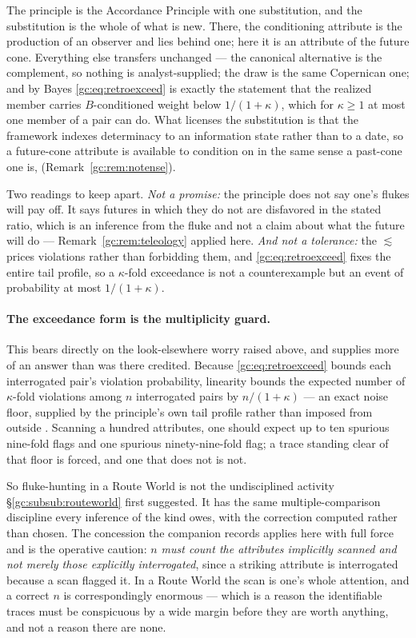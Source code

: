 \documentclass[11pt]{article}
\numberwithin{equation}{section}
\theoremstyle{plain}
\theoremstyle{definition}
\theoremstyle{remark}
\begin{document}
The principle is the Accordance Principle with one substitution, and the
substitution is the whole of what is new. There, the conditioning
attribute is the production of an observer and lies behind one; here it
is an attribute of the future cone. Everything else transfers unchanged
--- the canonical alternative is the complement, so nothing is
analyst-supplied; the draw is the same Copernican one; and by Bayes
\eqref{gc:eq:retroexceed} is exactly the statement that the realized
member carries $B$-conditioned weight below $1/(1+\kappa)$, which for
$\kappa\ge1$ at most one member of a pair can do. What licenses the
substitution is that the framework indexes determinacy to an information
state rather than to a date, so a future-cone attribute is available to
condition on in the same sense a past-cone one is,
(Remark~\ref{gc:rem:notense}).

Two readings to keep apart. \emph{Not a promise:} the principle does not
say one's flukes will pay off. It says futures in which they do not are
disfavored in the stated ratio, which is an inference from the fluke and
not a claim about what the future will do --- Remark~\ref{gc:rem:teleology}
applied here. \emph{And not a tolerance:} the $\lesssim$ prices
violations rather than forbidding them, and
\eqref{gc:eq:retroexceed} fixes the entire tail profile, so a
$\kappa$-fold exceedance is not a counterexample but an event of
probability at most $1/(1+\kappa)$.

\paragraph{The exceedance form is the multiplicity guard.}\label{gc:rem:noisefloor}
This bears directly on the look-elsewhere worry raised above, and
supplies more of an answer than was there credited. Because
\eqref{gc:eq:retroexceed} bounds each interrogated pair's violation
probability, linearity bounds the expected number of $\kappa$-fold
violations among $n$ interrogated pairs by $n/(1+\kappa)$ --- an exact
noise floor, supplied by the principle's own tail profile rather than
imposed from outside \cite{NexicFoundation}. Scanning a hundred
attributes, one should expect up to ten spurious nine-fold flags and one
spurious ninety-nine-fold flag; a trace standing clear of that floor is
forced, and one that does not is not.

So fluke-hunting in a Route World is not the undisciplined activity
\S\ref{gc:subsub:routeworld} first suggested. It has the same
multiple-comparison discipline every inference of the kind owes, with
the correction computed rather than chosen. The concession the companion
records applies here with full force and is the operative caution:
\emph{$n$ must count the attributes implicitly scanned and not merely
those explicitly interrogated}, since a striking attribute is
interrogated because a scan flagged it. In a Route World the scan is
one's whole attention, and a correct $n$ is correspondingly enormous ---
which is a reason the identifiable traces must be conspicuous by a wide
margin before they are worth anything, and not a reason there are none.
\end{document}
